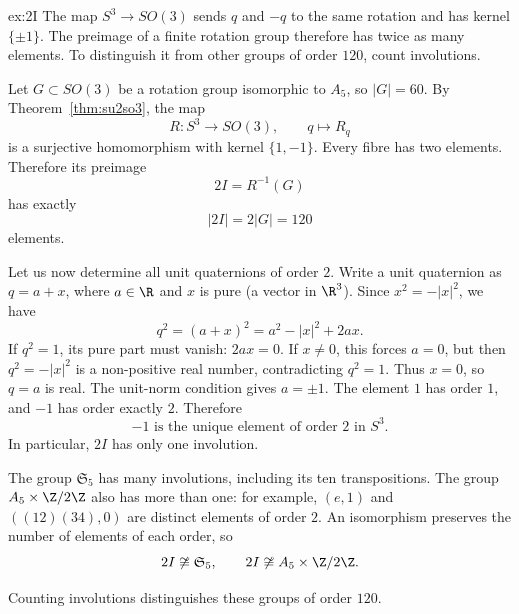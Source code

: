 \begin{solution}{ex:2I}
\idea The map $S^3\to SO(3)$ sends $q$ and $-q$ to the same rotation and has kernel $\{\pm1\}$. The preimage of a finite rotation group therefore has twice as many elements. To distinguish it from other groups of order $120$, count involutions.

\writeup Let $G\subset SO(3)$ be a rotation group isomorphic to $A_5$, so $|G|=60$. By Theorem~\ref{thm:su2so3}, the map
\[
R:S^3\to SO(3),\qquad q\mapsto R_q
\]
is a surjective homomorphism with kernel $\{1,-1\}$. Every fibre has two elements. Therefore its preimage
\[
2I=R^{-1}(G)
\]
has exactly
\[
\boxed{|2I|=2|G|=120}
\]
elements.

Let us now determine all unit quaternions of order $2$. Write a unit quaternion as $q=a+x$, where $a\in\R$ and $x$ is pure (a vector in $\R^3$). Since $x^2=-|x|^2$, we have
\[
q^2=(a+x)^2=a^2-|x|^2+2ax.
\]
If $q^2=1$, its pure part must vanish: $2ax=0$. If $x\ne0$, this forces $a=0$, but then $q^2=-|x|^2$ is a non-positive real number, contradicting $q^2=1$. Thus $x=0$, so $q=a$ is real. The unit-norm condition gives $a=\pm1$. The element $1$ has order $1$, and $-1$ has order exactly $2$. Therefore
\[
\boxed{-1\text{ is the unique element of order }2\text{ in }S^3}.
\]
In particular, $2I$ has only one involution.

The group $\mathfrak S_5$ has many involutions, including its ten transpositions. The group $A_5\times\Z/2\Z$ also has more than one: for example, $(e,1)$ and $((12)(34),0)$ are distinct elements of order $2$. An isomorphism preserves the number of elements of each order, so
\[
2I\not\cong\mathfrak S_5,
\qquad
2I\not\cong A_5\times\Z/2\Z.
\]

Counting involutions distinguishes these groups of order $120$.
\end{solution}

